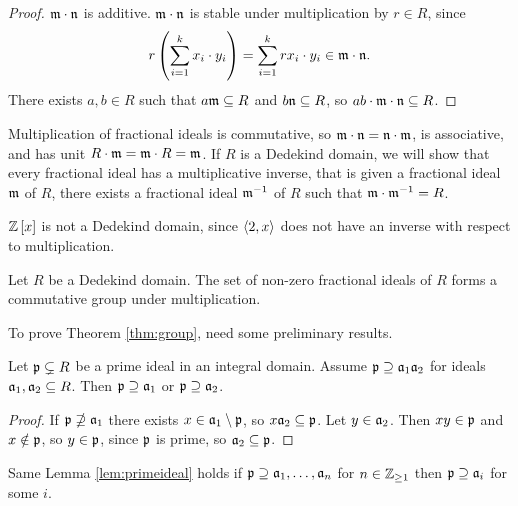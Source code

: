 \begin{proof}
$ \mm \cdot \nn $ is additive. $ \mm \cdot \nn $ is stable under multiplication by $ r \in R $, since
$$ r\br{\sum_{i = 1}^k x_i \cdot y_i} = \sum_{i = 1}^k rx_i \cdot y_i \in \mm \cdot \nn. $$
There exists $ a, b \in R $ such that $ a\mm \subseteq R $ and $ b\nn \subseteq R $, so $ ab \cdot \mm \cdot \nn \subseteq R $.
\end{proof}

Multiplication of fractional ideals is commutative, so $ \mm \cdot \nn = \nn \cdot \mm $, is associative, and has unit $ R \cdot \mm = \mm \cdot R = \mm $. If $ R $ is a Dedekind domain, we will show that every fractional ideal has a multiplicative inverse, that is given a fractional ideal $ \mm $ of $ R $, there exists a fractional ideal $ \mm^{-1} $ of $ R $ such that $ \mm \cdot \mm^{-1} = R $.

\begin{example*}
$ \Z\sbr{x} $ is not a Dedekind domain, since $ \abr{2, x} $ does not have an inverse with respect to multiplication.
\end{example*}

\begin{theorem}
\label{thm:group}
Let $ R $ be a Dedekind domain. The set of non-zero fractional ideals of $ R $ forms a commutative group under multiplication.
\end{theorem}

To prove Theorem \ref{thm:group}, need some preliminary results.

\begin{lemma}
\label{lem:primeideal}
Let $ \pp \subsetneq R $ be a prime ideal in an integral domain. Assume $ \pp \supseteq \aa_1\aa_2 $ for ideals $ \aa_1, \aa_2 \subseteq R $. Then $ \pp \supseteq \aa_1 $ or $ \pp \supseteq \aa_2 $.
\end{lemma}

\begin{proof}
If $ \pp \nsupseteq \aa_1 $ there exists $ x \in \aa_1 \setminus \pp $, so $ x\aa_2 \subseteq \pp $. Let $ y \in \aa_2 $. Then $ xy \in \pp $ and $ x \notin \pp $, so $ y \in \pp $, since $ \pp $ is prime, so $ \aa_2 \subseteq \pp $.
\end{proof}

\begin{remark*}
Same Lemma \ref{lem:primeideal} holds if $ \pp \supseteq \aa_1, \dots, \aa_n $ for $ n \in \Z_{\ge 1} $ then $ \pp \supseteq \aa_i $ for some $ i $.
\end{remark*}


